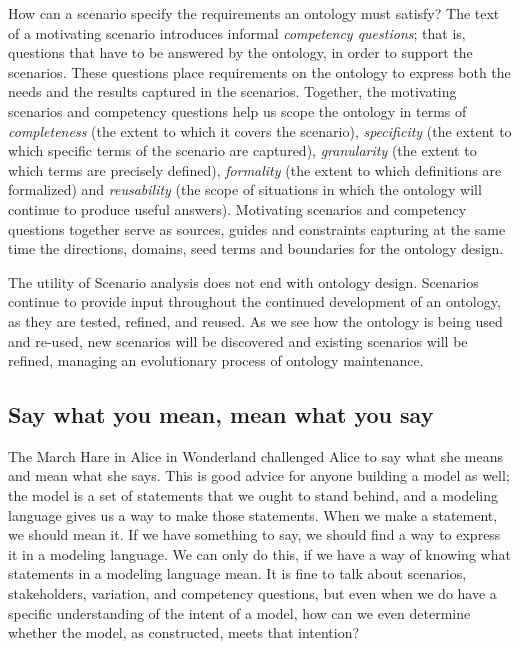 How can a scenario specify the requirements an ontology must satisfy?  The text of a 
motivating scenario introduces informal \emph{competency questions}; that is, questions 
that have to be answered by the ontology, in order to support the scenarios. 
These questions
place  requirements on the ontology to express both the needs and the results 
captured in the scenarios. Together, the motivating scenarios and competency 
questions help 
us scope the ontology in terms of \emph{completeness} (the extent to which it covers the 
scenario), \emph{specificity} (the extent to which specific terms of the scenario are captured), 
\emph{granularity} (the extent to which terms are precisely defined), \emph{formality} (the extent to 
which definitions are formalized) and \emph{reusability} (the scope of situations in which the
ontology will continue to produce useful answers). 
Motivating scenarios and competency questions together  serve as 
sources, guides and constraints capturing at the same time the directions, domains, seed 
terms and boundaries for the ontology design. 

The utility of Scenario 
analysis does not end with ontology design.  Scenarios continue to provide input 
throughout the continued development of an ontology, as they are tested, refined, 
and reused. As we see how the ontology is being used and re-used, new scenarios will 
be discovered  
and existing scenarios will  be refined, managing an evolutionary process of
ontology maintenance. 



\subsection{Say what you mean, mean what you say}
\label{ch15:swym}
The March Hare in Alice in Wonderland challenged Alice to say what she
means and mean what she says. This is good advice for anyone building a
model as well; the model is a set of statements that we ought to stand
behind, and a modeling language gives us a way to make those statements.
When we make a statement, we should mean it. If we have something to
say, we should find a way to express it in a modeling language. We can
only do this, if we have a way of knowing what statements in a modeling
language mean. It is fine to talk about scenarios,  stakeholders, variation, and
competency questions, but even when we do have a specific understanding
of the intent of a model, how can we even determine whether the model,
as constructed, meets that intention?


